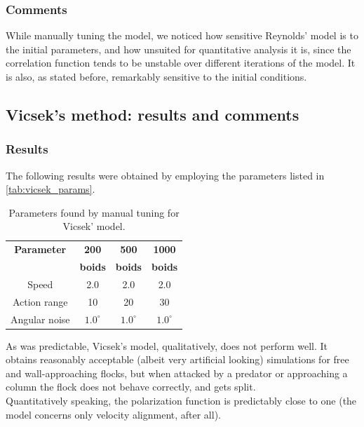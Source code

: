 \subsubsection{Comments}
While manually tuning the model, we noticed how sensitive Reynolds' model is to the initial parameters, and how unsuited for quantitative analysis it is, since the correlation function tends to be unstable over different iterations of the model. It is also, as stated before, remarkably sensitive to the initial conditions.
\subsection{Vicsek's method: results and comments}
\subsubsection{Results}
The following results were obtained by employing the parameters listed in \autoref{tab:vicsek_params}.
\begin{table}[ht]
    \centering
    \begin{tabular}{|c|c|c|c|}
        \hline
        \textbf{Parameter} & \textbf{200}   & \textbf{500}   & \textbf{1000}  \\
                           & \textbf{boids} & \textbf{boids} & \textbf{boids} \\ \hline
        Speed              & 2.0            & 2.0            & 2.0            \\ \hline
        Action range       & 10             & 20             & 30             \\ \hline
        Angular noise      & $1.0^\circ$    & $1.0^\circ$    & $1.0^\circ$    \\ \hline
    \end{tabular}
    \caption{Parameters found by manual tuning for Vicsek' model.}
    \label{tab:vicsek_params}
\end{table}
As was predictable, Vicsek's model, qualitatively, does not perform well. It obtains reasonably acceptable (albeit very artificial looking) simulations for free and wall-approaching flocks, but when attacked by a predator or approaching a column the flock does not behave correctly, and gets split. \\
Quantitatively speaking, the polarization function is predictably close to one (the model concerns only velocity alignment, after all). \\
